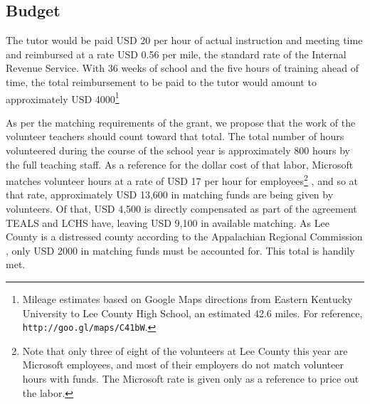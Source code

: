 \subsection{Budget}\label{ssec:budget}

The tutor would be paid USD 20 per hour of actual instruction and meeting time
and reimbursed at a rate USD 0.56 per mile, the standard rate of the Internal
Revenue Service. With 36 weeks of school and the five hours of training ahead
of time, the total reimbursement to be paid to the tutor would amount to
approximately USD 4000\footnote{Mileage estimates based on Google Maps
directions from Eastern Kentucky University to Lee County High School, an
estimated 42.6 miles. For reference, {\tt http://goo.gl/maps/C41bW}.}

As per the matching requirements of the grant, we propose that the work of the
volunteer teachers should count toward that total. The total number of hours
volunteered during the course of the school year is approximately 800 hours
by the full teaching staff. As a reference for the dollar cost of that labor,
Microsoft matches volunteer hours at a rate of
USD 17 per hour for employees\footnote{Note that only three of eight of the
volunteers at Lee County this year are Microsoft employees, and most of their
employers do not match volunteer hours with funds. The Microsoft rate is given
only as a reference to price out the labor.} \autocite{MicrosoftGuidebook}, and
so at that rate, approximately USD 13,600
in matching funds are being given by volunteers. Of that, USD 4,500 is directly
compensated as part of the agreement TEALS and LCHS have, leaving USD 9,100 in
available matching. As Lee County is a distressed county according to the
Appalachian Regional Commission \autocite{DistressedCounties}, only USD 2000 in
matching funds must be accounted for. This total is handily met.

